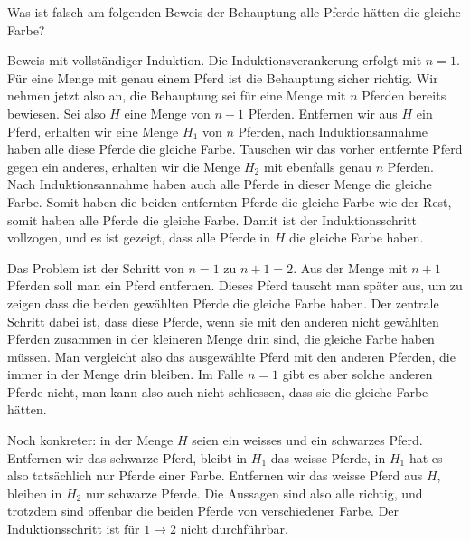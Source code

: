 Was ist falsch am folgenden Beweis der Behauptung alle Pferde hätten die
gleiche Farbe?

Beweis mit vollständiger Induktion. Die Induktionsverankerung
erfolgt mit $n=1$. Für eine Menge mit genau einem Pferd ist
die Behauptung sicher richtig. Wir nehmen jetzt also an, die
Behauptung sei für eine Menge mit $n$ Pferden bereits bewiesen.
Sei also $H$ eine Menge von $n+1$ Pferden. Entfernen wir aus $H$
ein Pferd, erhalten wir eine Menge $H_1$ von $n$ Pferden, nach
Induktionsannahme haben alle diese Pferde die gleiche Farbe.
Tauschen wir das vorher entfernte Pferd gegen ein anderes, erhalten
wir die Menge $H_2$ mit ebenfalls genau $n$ Pferden. Nach Induktionsannahme
haben auch alle Pferde in dieser Menge die gleiche Farbe. Somit
haben die beiden entfernten Pferde die gleiche Farbe wie der Rest,
somit haben alle Pferde die gleiche Farbe. Damit ist der Induktionsschritt
vollzogen, und es ist gezeigt, dass alle Pferde in $H$ die gleiche Farbe
haben.


\begin{loesung}
Das Problem ist der Schritt von $n=1$ zu $n+1=2$.
Aus der Menge mit $n+1$ Pferden soll man ein Pferd entfernen.
Dieses Pferd tauscht man später aus, um zu zeigen dass die
beiden gewählten Pferde die gleiche Farbe haben. Der zentrale
Schritt dabei ist, dass diese Pferde, wenn sie mit den anderen nicht
gewählten Pferden zusammen in der kleineren Menge drin sind,
die gleiche Farbe haben müssen. Man vergleicht also das ausgewählte
Pferd mit den anderen Pferden, die immer in der Menge drin bleiben.
Im Falle $n=1$ gibt es aber solche
anderen Pferde nicht, man kann also auch nicht schliessen, dass
sie die gleiche Farbe hätten.

Noch konkreter: in der Menge $H$ seien ein weisses und ein schwarzes Pferd.
Entfernen wir das schwarze Pferd, bleibt in $H_1$ das weisse Pferde,
in $H_1$ hat es also tatsächlich nur Pferde einer Farbe. Entfernen
wir das weisse Pferd aus $H$, bleiben in $H_2$ nur schwarze
Pferde. Die Aussagen sind also alle richtig, und trotzdem sind
offenbar die beiden Pferde von verschiedener Farbe. Der Induktionsschritt
ist für $1\to 2$ nicht durchführbar.
\end{loesung}
